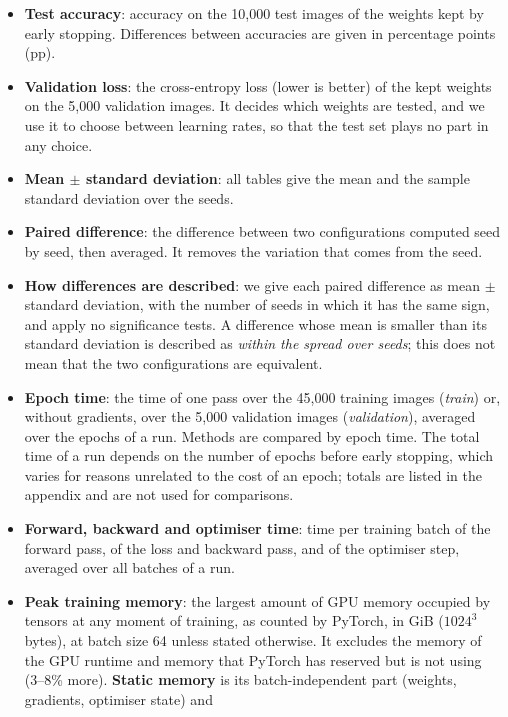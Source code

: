 \begin{itemize}
  \item \textbf{Test accuracy}: accuracy on the 10,000 test images of the weights kept by early stopping.
        Differences between accuracies are given in percentage points (pp).
  \item \textbf{Validation loss}: the cross-entropy loss (lower is better) of the kept weights on the 5,000
        validation images. It decides which weights are tested, and we use it to choose between learning rates, so
        that the test set plays no part in any choice.
  \item \textbf{Mean $\pm$ standard deviation}: all tables give the mean and the sample standard deviation over
        the seeds.
  \item \textbf{Paired difference}: the difference between two configurations computed seed by seed, then
        averaged. It removes the variation that comes from the seed.
  \item \textbf{How differences are described}: we give each paired difference as mean $\pm$ standard
        deviation, with the number of seeds in which it has the same sign, and apply no significance tests. A
        difference whose mean is smaller than its standard deviation is described as \emph{within the spread over
        seeds}; this does not mean that the two configurations are equivalent.
  \item \textbf{Epoch time}: the time of one pass over the 45,000 training images (\emph{train}) or, without
        gradients, over the 5,000 validation images (\emph{validation}), averaged over the epochs of a run. Methods
        are compared by epoch time. The total time of a run depends on the number of epochs before early stopping,
        which varies for reasons unrelated to the cost of an epoch; totals are listed in the appendix and are not
        used for comparisons.
  \item \textbf{Forward, backward and optimiser time}: time per training batch of the forward pass, of the loss
        and backward pass, and of the optimiser step, averaged over all batches of a run.
  \item \textbf{Peak training memory}: the largest amount of GPU memory occupied by tensors at any moment of
        training, as counted by PyTorch, in GiB ($1024^3$ bytes), at batch size 64 unless stated otherwise. It
        excludes the memory of the GPU runtime and memory that PyTorch has reserved but is not using (3--8\% more).
        \textbf{Static memory} is its batch-independent part (weights, gradients, optimiser state) and

\end{itemize}
